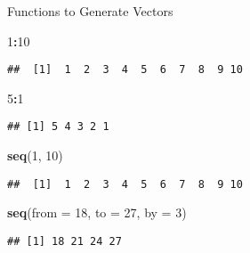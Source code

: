 \documentclass[ignorenonframetext,]{beamer}
\newenvironment{Shaded}{\begin{snugshade}}{\end{snugshade}}
\newcommand{\DataTypeTok}[1]{\textcolor[rgb]{0.13,0.29,0.53}{#1}}
\newcommand{\DecValTok}[1]{\textcolor[rgb]{0.00,0.00,0.81}{#1}}
\newcommand{\KeywordTok}[1]{\textcolor[rgb]{0.13,0.29,0.53}{\textbf{#1}}}
\newcommand{\NormalTok}[1]{#1}
\newcommand{\OperatorTok}[1]{\textcolor[rgb]{0.81,0.36,0.00}{\textbf{#1}}}
\begin{document}
\begin{frame}[fragile]{Functions to Generate Vectors}
\protect\hypertarget{functions-to-generate-vectors}{}

\begin{Shaded}
\begin{Highlighting}[]
\DecValTok{1}\OperatorTok{:}\DecValTok{10}
\end{Highlighting}
\end{Shaded}

\begin{verbatim}
##  [1]  1  2  3  4  5  6  7  8  9 10
\end{verbatim}

\begin{Shaded}
\begin{Highlighting}[]
\DecValTok{5}\OperatorTok{:}\DecValTok{1}
\end{Highlighting}
\end{Shaded}

\begin{verbatim}
## [1] 5 4 3 2 1
\end{verbatim}

\begin{Shaded}
\begin{Highlighting}[]
\KeywordTok{seq}\NormalTok{(}\DecValTok{1}\NormalTok{, }\DecValTok{10}\NormalTok{)}
\end{Highlighting}
\end{Shaded}

\begin{verbatim}
##  [1]  1  2  3  4  5  6  7  8  9 10
\end{verbatim}

\begin{Shaded}
\begin{Highlighting}[]
\KeywordTok{seq}\NormalTok{(}\DataTypeTok{from =} \DecValTok{18}\NormalTok{, }\DataTypeTok{to =} \DecValTok{27}\NormalTok{, }\DataTypeTok{by =} \DecValTok{3}\NormalTok{)}
\end{Highlighting}
\end{Shaded}

\begin{verbatim}
## [1] 18 21 24 27
\end{verbatim}

\end{frame}
\end{document}
